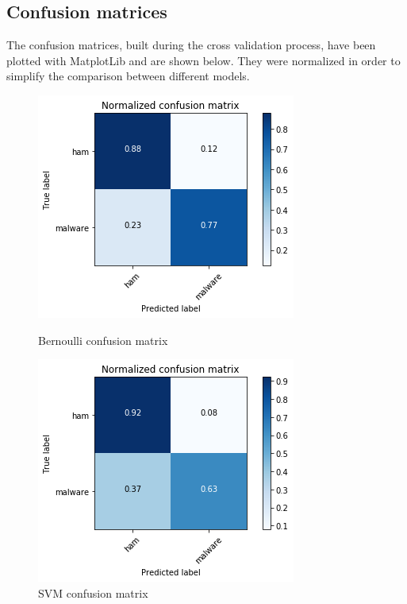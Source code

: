 \documentclass[12pt]{article}
\begin{document}
\subsection{Confusion matrices}
The confusion matrices, built during the cross validation process, have been plotted with MatplotLib and are shown below. They were normalized in order to simplify the comparison between different models.
\begin{figure}[!ht]
	\centering
	\begin{minipage}{.5\textwidth}
		\centering
		\includegraphics[width=.8\linewidth]{cnf_m_bernoulli.png}
		\caption{Bernoulli confusion matrix} %
		\label{fig:cnf_m_bernoulli}
	\end{minipage}%
	\begin{minipage}{.5\textwidth}
		\centering
		\includegraphics[width=.8\linewidth]{cnf_m_svm.png}
		\caption{SVM confusion matrix} %
		\label{fig:cnf_m_svm}
	\end{minipage}
\end{figure}
\end{document}
